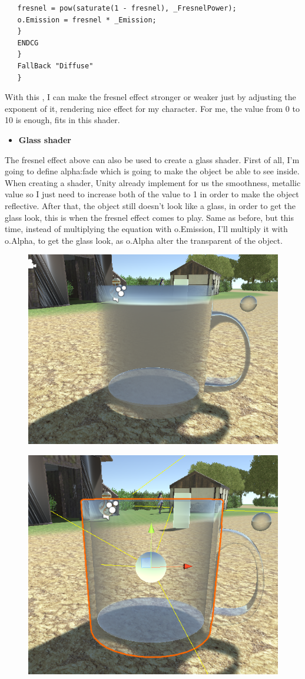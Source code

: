 \documentclass[a4paper, 13pt]{extarticle}
\begin{document}
{\begin{lstlisting}
   fresnel = pow(saturate(1 - fresnel), _FresnelPower);
   o.Emission = fresnel * _Emission;
   }
   ENDCG							  
   } 
   FallBack "Diffuse"
   }
   \end{lstlisting}
  With this , I can make the fresnel effect stronger or weaker just by adjusting the exponent of it, rendering nice effect for my character. For me, the value from 0 to 10 is enough, fits in this shader.
   \begin{itemize}
  	\item \bfseries Glass shader
  \end{itemize}  
  	The fresnel effect above can also be used to create a glass shader. First of all, I'm going to define alpha:fade which is going to make the object be able to see inside. When creating a shader, Unity already implement for us the smoothness, metallic value so I just need to increase both of the value to 1 in order to make the object reflective. After that, the object still doesn't look like a glass, in order to get the glass look, this is when the fresnel effect comes to play. Same as before, but this time, instead of multiplying the equation with o.Emission, I'll multiply it with o.Alpha, to get the glass look, as o.Alpha alter the transparent of the object.
  	\begin{figure}[h]
  		\begin{minipage}{.5\textwidth}
  			\centering
  			\includegraphics[width=0.7\linewidth]{intructions/whole_surface.png}
  			\centering
  			\label{fig:test30}
  		\end{minipage}
  		\begin{minipage}{.5\textwidth}
  			\centering
  			\includegraphics[width=0.6\linewidth]{intructions/from_edge.png}
  			\centering
  			\label{fig:test31}
  		\end{minipage}
  		

\end{figure}}
\end{document}
